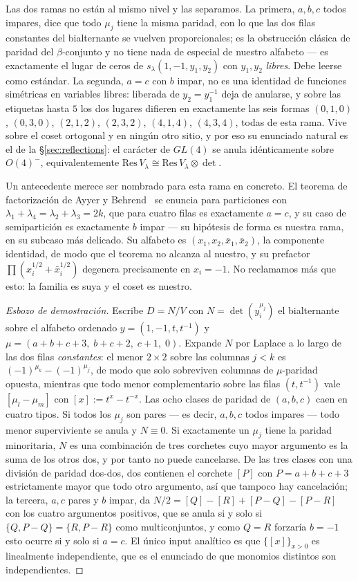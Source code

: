 \documentclass[11pt,a4paper]{article}
\begin{document}
Las dos ramas no están al mismo nivel y las separamos. La primera, $a,b,c$ todos impares, dice
que todo $\mu_j$ tiene la misma paridad, con lo que las dos filas constantes del bialternante se
vuelven proporcionales; es la obstrucción clásica de paridad del $\beta$-conjunto y no tiene
nada de especial de nuestro alfabeto --- es exactamente el lugar de ceros de
$s_\lambda(1,-1,y_1,y_2)$ con $y_1,y_2$ \emph{libres}. Debe leerse como estándar. La segunda,
$a=c$ con $b$ impar, no es una identidad de funciones simétricas en variables libres: liberada
de $y_2=y_1^{-1}$ deja de anularse, y sobre las etiquetas hasta $5$ los dos lugares difieren en
exactamente las seis formas $(0,1,0)$, $(0,3,0)$, $(2,1,2)$, $(2,3,2)$, $(4,1,4)$, $(4,3,4)$,
todas de esta rama. Vive sobre el coset ortogonal y en ningún otro sitio, y por eso su
enunciado natural es el de la \S\ref{sec:reflections}: el carácter de $GL(4)$ se anula
idénticamente sobre $O(4)^-$, equivalentemente
$\mathrm{Res}\,V_\lambda\cong\mathrm{Res}\,V_\lambda\otimes\det$.

Un antecedente merece ser nombrado para esta rama en concreto. El teorema de factorización de
Ayyer y Behrend~\cite[Tma.~1]{AyyerBehrend} se enuncia para particiones con
$\lambda_1+\lambda_4=\lambda_2+\lambda_3=2k$, que para cuatro filas es exactamente $a=c$, y su
caso de semipartición es exactamente $b$ impar --- su hipótesis de forma es nuestra rama, en su
subcaso más delicado. Su alfabeto es $(x_1,x_2,\bar x_1,\bar x_2)$, la componente identidad, de
modo que el teorema no alcanza al nuestro, y su prefactor $\prod(x_i^{1/2}+\bar x_i^{1/2})$
degenera precisamente en $x_i=-1$. No reclamamos más que esto: la familia es suya y el coset es
nuestro.

\begin{proof}[Esbozo de demostración]
Escribe $D=N/V$ con $N=\det(y_i^{\mu_j})$ el bialternante sobre el alfabeto ordenado
$y=(1,-1,t,t^{-1})$ y $\mu=(a{+}b{+}c{+}3,\;b{+}c{+}2,\;c{+}1,\;0)$. Expande $N$ por Laplace
a lo largo de las dos filas \emph{constantes}: el menor $2\times2$ sobre las columnas $j<k$
es $(-1)^{\mu_k}-(-1)^{\mu_j}$, de modo que solo sobreviven columnas de $\mu$-paridad
opuesta, mientras que todo menor complementario sobre las filas $(t,t^{-1})$ vale
$[\mu_l-\mu_m]$ con $[x]:=t^x-t^{-x}$. Las ocho clases de paridad de $(a,b,c)$ caen en cuatro
tipos. Si todos los $\mu_j$ son pares --- es decir, $a,b,c$ todos impares --- todo menor
superviviente se anula y $N\equiv0$. Si exactamente un $\mu_j$ tiene la paridad minoritaria,
$N$ es una combinación de tres corchetes cuyo mayor argumento es la suma de los otros dos, y
por tanto no puede cancelarse. De las tres clases con una división de paridad dos-dos, dos
contienen el corchete $[P]$ con $P=a{+}b{+}c{+}3$ estrictamente mayor que todo otro
argumento, así que tampoco hay cancelación; la tercera, $a,c$ pares y $b$ impar, da
$N/2=[Q]-[R]+[P{-}Q]-[P{-}R]$ con los cuatro argumentos positivos, que se anula si y solo si
$\{Q,P{-}Q\}=\{R,P{-}R\}$ como multiconjuntos, y como $Q=R$ forzaría $b=-1$ esto ocurre si y
solo si $a=c$. El único input analítico es que $\{[x]\}_{x>0}$ es linealmente independiente,
que es el enunciado de que monomios distintos son independientes.
\end{proof}
\end{document}
